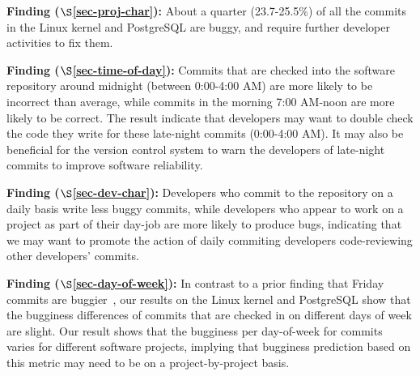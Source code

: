 \begin{list}{}{\topsep=0pt\parsep=0pt\leftmargin=9pt\itemindent=0pt}

\item {\bf Finding \fbuggy ($\S$\ref{sec-proj-char}):} 
About a quarter (23.7-25.5\%) of all the commits in the Linux kernel and PostgreSQL are buggy, 
and require further developer activities to fix them.

\item {\bf Finding \fhour ($\S$\ref{sec-time-of-day}):} 
Commits that are checked into the software repository around midnight (between 0:00-4:00 AM) 
are more likely to be incorrect than average, while commits in the morning 7:00 AM-noon 
are more likely to be correct.
The result indicate that developers may want to double check the code they write for these 
late-night commits (0:00-4:00 AM).
It may also be beneficial for the version control
system to warn the developers of late-night commits to improve software reliability. 


\item {\bf Finding \fdaily ($\S$\ref{sec-dev-char}):} 
Developers who commit to the repository on a daily basis
write less buggy commits, while developers who appear to work on a project
as part of their day-job are more likely to produce
bugs, indicating that we may 
want to promote the action of daily commiting developers code-reviewing other 
developers' commits.


\item {\bf Finding \fday ($\S$\ref{sec-day-of-week}):} 
In contrast to a prior finding that Friday commits are buggier~\cite{sliwerski-msr-2005}, 
our results on the Linux kernel and PostgreSQL show that 
the bugginess differences of commits that are checked in on different days of week 
are slight. Our result shows that the bugginess per day-of-week for commits
varies for different software projects, implying that bugginess prediction based on this 
metric may need to be on a project-by-project basis.

\end{list}


